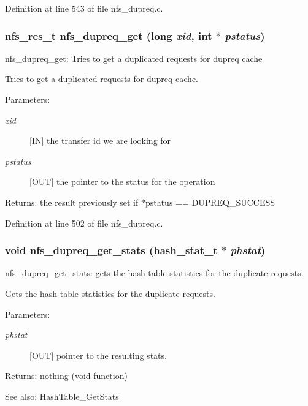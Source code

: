 Definition at line 543 of file nfs\_\-dupreq.c.
\subsubsection[{nfs\_\-dupreq\_\-get}]{\setlength{\rightskip}{0pt plus 5cm}nfs\_\-res\_\-t nfs\_\-dupreq\_\-get (long {\em xid}, \/  int $\ast$ {\em pstatus})}\label{nfs__dupreq_8c_f44969aca0de15c4a2079988b6e6c266}


nfs\_\-dupreq\_\-get: Tries to get a duplicated requests for dupreq cache

Tries to get a duplicated requests for dupreq cache.

\begin{Desc}
\item[Parameters:]
\begin{description}
\item[{\em xid}][IN] the transfer id we are looking for \item[{\em pstatus}][OUT] the pointer to the status for the operation\end{description}
\end{Desc}
\begin{Desc}
\item[Returns:]the result previously set if $\ast$pstatus == DUPREQ\_\-SUCCESS \end{Desc}


Definition at line 502 of file nfs\_\-dupreq.c.
\subsubsection[{nfs\_\-dupreq\_\-get\_\-stats}]{\setlength{\rightskip}{0pt plus 5cm}void nfs\_\-dupreq\_\-get\_\-stats (hash\_\-stat\_\-t $\ast$ {\em phstat})}\label{nfs__dupreq_8c_ade2ed32dcdd7eb6990c8f99f5c81370}


nfs\_\-dupreq\_\-get\_\-stats: gets the hash table statistics for the duplicate requests.

Gets the hash table statistics for the duplicate requests.

\begin{Desc}
\item[Parameters:]
\begin{description}
\item[{\em phstat}][OUT] pointer to the resulting stats.\end{description}
\end{Desc}
\begin{Desc}
\item[Returns:]nothing (void function)\end{Desc}
\begin{Desc}
\item[See also:]HashTable\_\-GetStats \end{Desc}


